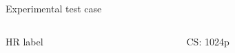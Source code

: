 \documentclass[10pt,aspectratio=169,dvipsnames]{beamer} %
\begin{document}
\begin{frame}{Experimental test case}
\begin{columns}[T]
\begin{column}[t]{.25\textwidth}
\begin{block}{HR label}
\begin{figure}
					\vfill
				\end{figure}
			\end{block}
		\end{column}
		\begin{column}[t]{.25\textwidth}
			\begin{block}{CS: 1024p}
				\begin{figure}
					\centering
					\vfill						

\end{figure}
\end{block}
\end{column}
\end{columns}
\end{frame}
\end{document}
